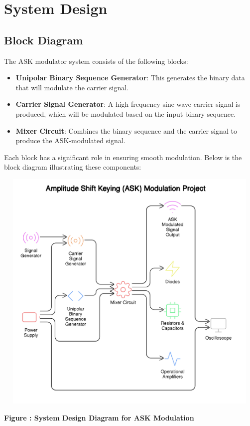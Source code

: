\documentclass[12pt,a4paper]{article}
\begin{document}
\section*{System Design}
\subsection*{Block Diagram}
The ASK modulator system consists of the following blocks:
\begin{itemize}
    \item \textbf{Unipolar Binary Sequence Generator}: This generates the binary data that will modulate the carrier signal.
    \item \textbf{Carrier Signal Generator}: A high-frequency sine wave carrier signal is produced, which will be modulated based on the input binary sequence.
    \item \textbf{Mixer Circuit}: Combines the binary sequence and the carrier signal to produce the ASK-modulated signal.
\end{itemize}

Each block has a significant role in ensuring smooth modulation. Below is the block diagram illustrating these components:
\begin{center}
    {\includegraphics[width=550px, height=450px]{SD.png}}
    \parbox{0.8\textwidth}{ 
        \centering
        \textbf{Figure : System Design Diagram for ASK Modulation}
    }
\end{center}
\end{document}
